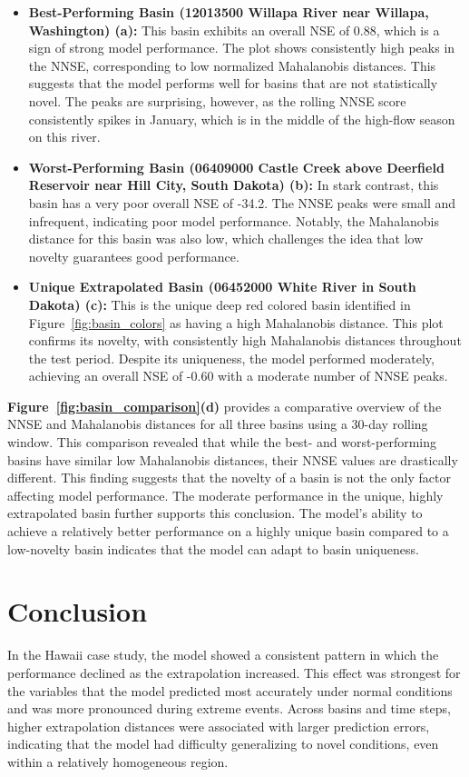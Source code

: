 \documentclass{article}
\begin{document}
\begin{itemize}
    \item \textbf{Best-Performing Basin (12013500 Willapa River near Willapa, Washington) (a):} This basin exhibits an overall NSE of 0.88, which is a sign of strong model performance. The plot shows consistently high peaks in the NNSE, corresponding to low normalized Mahalanobis distances. This suggests that the model performs well for basins that are not statistically novel. The peaks are surprising, however, as the rolling NNSE score consistently spikes in January, which is in the middle of the high-flow season on this river. 
    \item \textbf{Worst-Performing Basin (06409000 Castle Creek above Deerfield Reservoir near Hill City, South Dakota) (b):} In stark contrast, this basin has a very poor overall NSE of -34.2. The NNSE peaks were small and infrequent, indicating poor model performance. Notably, the Mahalanobis distance for this basin was also low, which challenges the idea that low novelty guarantees good performance.
    \item \textbf{Unique Extrapolated Basin (06452000 White River in South Dakota) (c):} This is the unique deep red colored basin identified in Figure~\ref{fig:basin_colors} as having a high Mahalanobis distance. This plot confirms its novelty, with consistently high Mahalanobis distances throughout the test period. Despite its uniqueness, the model performed moderately, achieving an overall NSE of -0.60 with a moderate number of NNSE peaks.
\end{itemize}

\textbf{Figure~\ref{fig:basin_comparison}(d)} provides a comparative overview of the NNSE and Mahalanobis distances for all three basins using a 30-day rolling window. This comparison revealed that while the best- and worst-performing basins have similar low Mahalanobis distances, their NNSE values are drastically different. This finding suggests that the novelty of a basin is not the only factor affecting model performance. The moderate performance in the unique, highly extrapolated basin further supports this conclusion. The model's ability to achieve a relatively better performance on a highly unique basin compared to a low-novelty basin indicates that the model can adapt to basin uniqueness.

\section{Conclusion}
In the Hawaii case study, the model showed a consistent pattern in which the performance declined as the extrapolation increased. This effect was strongest for the variables that the model predicted most accurately under normal conditions and was more pronounced during extreme events. Across basins and time steps, higher extrapolation distances were associated with larger prediction errors, indicating that the model had difficulty generalizing to novel conditions, even within a relatively homogeneous region.
\end{document}
